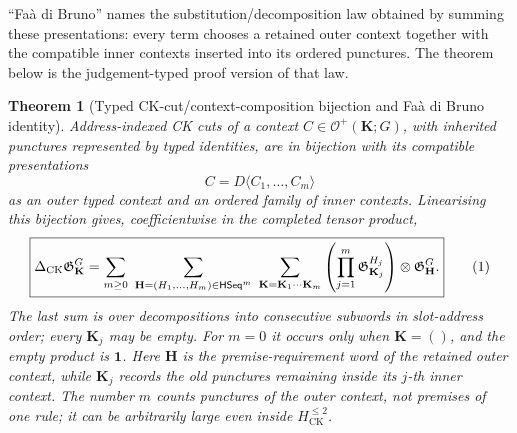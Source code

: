 \documentclass[10pt,a4paper]{article}
\theoremstyle{plain}
\newtheorem{theorem}{Theorem}[section]
\theoremstyle{definition}
\theoremstyle{remark}
\newcommand{\HCK}{H_{\mathrm{CK}}}
\newcommand{\DeltaCK}{\Delta_{\mathrm{CK}}}
\newcommand{\HSeq}{\mathsf{HSeq}}
\newcommand{\one}{\mathbf 1}
\newcommand{\eqtag}{\refstepcounter{equation}\tag{\theequation}}
\begin{document}
``Fa\`a di Bruno'' names the substitution/decomposition law obtained by
summing these presentations: every term chooses a retained outer context
together with the compatible inner contexts inserted into its ordered
punctures.  The theorem below is the judgement-typed proof version of that
law.

\begin{theorem}[Typed CK-cut/context-composition bijection and Fa\`a di Bruno identity]
\label{thm:typed-faa}
Address-indexed CK cuts of a context
\(C\in\mathcal O^+(\mathbf K;G)\), with inherited punctures represented
by typed identities, are in bijection with its compatible presentations
\[
                C=D\langle C_1,\ldots,C_m\rangle
\]
as an outer typed context and an ordered family of inner contexts.
Linearising this bijection gives, coefficientwise in the completed tensor
product,
\[
\boxed{
 \DeltaCK\mathfrak G^G_{\mathbf K}
 =
 \sum_{m\ge0}
 \ \sum_{\mathbf H=(H_1,\ldots,H_m)\in\HSeq^m}
 \ \sum_{\mathbf K=\mathbf K_1\cdots\mathbf K_m}
 \left(
   \prod_{j=1}^{m}\mathfrak G^{H_j}_{\mathbf K_j}
 \right)
 \otimes
 \mathfrak G^G_{\mathbf H}.
}
\eqtag\label{eq:typed-operadic-faa}
\]
The last sum is over decompositions into consecutive subwords in
slot-address order; every \(\mathbf K_j\) may be empty.  For \(m=0\) it occurs only
when \(\mathbf K=()\), and the empty product is \(\one\).
Here \(\mathbf H\) is the premise-requirement word of the retained outer
context, while \(\mathbf K_j\) records the old punctures remaining inside
its \(j\)-th inner context.  The number \(m\) counts punctures of the
outer context, not premises of one rule; it can be arbitrarily large even
inside \(\HCK^{\le2}\).
\end{theorem}
\end{document}
